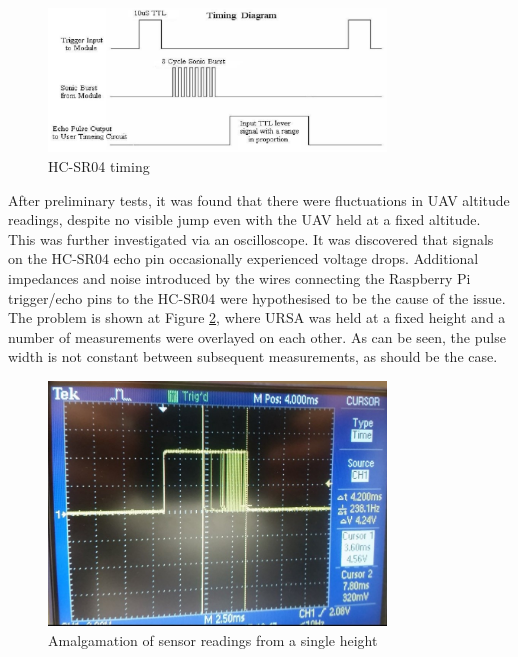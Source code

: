 \documentclass[capstone_report.tex]{subfiles}
\begin{document}
    \begin{figure}[H]
        \centering
        \includegraphics[width=0.8\textwidth]{imgs/sr04.png}
        \caption{HC-SR04 timing\label{fig:sr04}}
    \end{figure}

After preliminary tests, it was found that there were fluctuations in UAV altitude readings, despite no visible jump even with the UAV held at a fixed altitude. This was further investigated via an oscilloscope. It was discovered that signals on the HC-SR04 echo pin occasionally experienced voltage drops. Additional impedances and noise introduced by the wires connecting the Raspberry Pi trigger/echo pins to the HC-SR04 were hypothesised to be the cause of the issue. \\

The problem is shown at Figure \ref{fig:badSig}, where URSA was held at a fixed height and a number of measurements were overlayed on each other. As can be seen, the pulse width is not constant between subsequent measurements, as should be the case.
    \begin{figure}[H]
        \centering
        \includegraphics[width=0.8\textwidth]{imgs/pulseBroad.jpg}
        \caption{Amalgamation of sensor readings from a single height\label{fig:badSig}}
    \end{figure}
\end{document}
